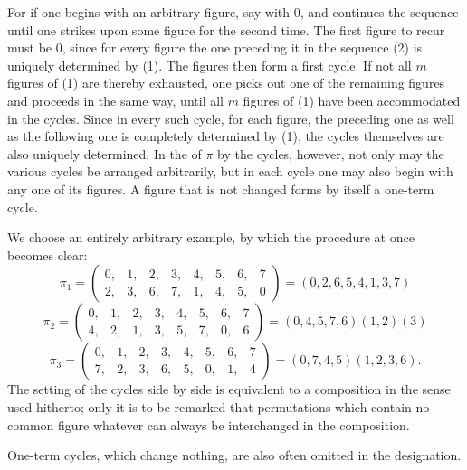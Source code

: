 
For if
one begins with an arbitrary figure, say with 0, and continues the sequence
until one strikes upon some figure for the second time. The first figure to recur must be 0, since for every figure the one preceding it in the sequence (2) is uniquely determined by (1). The figures
then form a first cycle. If not all $m$ figures of (1) are thereby exhausted, one picks out one of the remaining figures and proceeds in the same way, until all $m$ figures of (1) have been accommodated in the cycles. Since in every such cycle, for each figure, the preceding one as well as the following one is completely determined by (1), the cycles themselves are also uniquely determined. In the  of $\pi$ by the cycles, however, not only may the various cycles be arranged arbitrarily, but in each cycle one may also begin with any one of its figures. A figure that is not changed forms by itself a one-term cycle.

We choose an entirely arbitrary example, by which the procedure at once becomes clear:
\[
\pi_1 = \begin{pmatrix} 0, & 1, & 2, & 3, & 4, & 5, & 6, & 7 \\ 2, & 3, & 6, & 7, & 1, & 4, & 5, & 0 \end{pmatrix} = (0, 2, 6, 5, 4, 1, 3, 7)
\]
\[
\pi_2 = \begin{pmatrix} 0, & 1, & 2, & 3, & 4, & 5, & 6, & 7 \\ 4, & 2, & 1, & 3, & 5, & 7, & 0, & 6 \end{pmatrix} = (0, 4, 5, 7, 6)(1, 2)(3)
\]
\[
\pi_3 = \begin{pmatrix} 0, & 1, & 2, & 3, & 4, & 5, & 6, & 7 \\ 7, & 2, & 3, & 6, & 5, & 0, & 1, & 4 \end{pmatrix} = (0, 7, 4, 5)(1, 2, 3, 6).
\]
The setting of the cycles side by side is equivalent to a composition in the sense used hitherto; only it is to be remarked that permutations which contain no common figure whatever can always be interchanged in the composition.

One-term cycles, which change nothing, are also often omitted in the designation.
